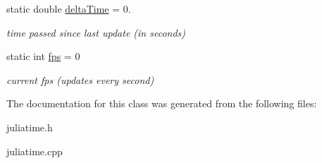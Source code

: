 \begin{DoxyCompactItemize}
\mbox{\label{classJuliaTime_a9bc0d5c43e2bfbefd25ff742d9aa3042}} 
static double \hyperlink{classJuliaTime_a9bc0d5c43e2bfbefd25ff742d9aa3042}{delta\+Time} = 0.
\begin{DoxyCompactList}\small\item\em time passed since last update (in seconds) \end{DoxyCompactList}\item 
\mbox{\label{classJuliaTime_ad2bffc176fa8c7d97e95459631d739d8}} 
static int \hyperlink{classJuliaTime_ad2bffc176fa8c7d97e95459631d739d8}{fps} = 0
\begin{DoxyCompactList}\small\item\em current fps (updates every second) \end{DoxyCompactList}\end{DoxyCompactItemize}


The documentation for this class was generated from the following files\+:\begin{DoxyCompactItemize}
\item 
juliatime.\+h\item 
juliatime.\+cpp\end{DoxyCompactItemize}
